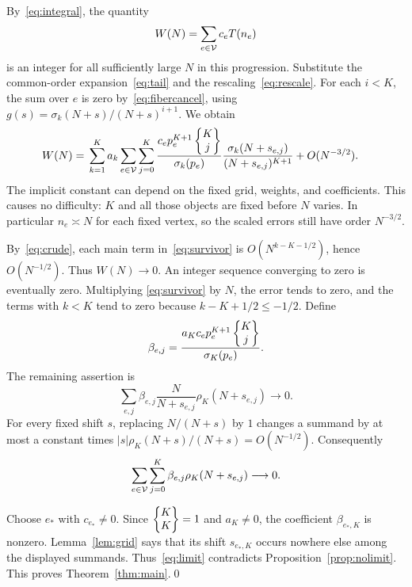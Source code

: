 By~\eqref{eq:integral}, the quantity
\[
 W(N)=\sum_{e\in\mathcal V}c_eT(n_e)
\]
is an integer for all sufficiently large $N$ in this progression.
Substitute the common-order expansion~\eqref{eq:tail} and
the rescaling~\eqref{eq:rescale}. For each $i<K$, the sum over
$e$ is zero by~\eqref{eq:fibercancel}, using
$g(s)=\sigma_k(N+s)/(N+s)^{i+1}$. We obtain
\begin{align}\label{eq:survivor}
 W(N)={}&\sum_{k=1}^{K}a_k\sum_{e\in\mathcal V}\sum_{j=0}^{K}
 \frac{c_ep_e^{K+1}\left\{\begin{matrix}K\\j\end{matrix}\right\}}{\sigma_k(p_e)}
 \frac{\sigma_k(N+s_{e,j})}{(N+s_{e,j})^{K+1}}
   +O(N^{-3/2}).
\end{align}
The implicit constant can depend on the fixed grid, weights, and
coefficients. This causes no difficulty: $K$ and all those objects
are fixed before $N$ varies. In particular $n_e\asymp N$ for each
fixed vertex, so the scaled errors still have order $N^{-3/2}$.

By~\eqref{eq:crude}, each main term in~\eqref{eq:survivor} is
$O(N^{k-K-1/2})$, hence $O(N^{-1/2})$. Thus $W(N)\to0$.
An integer sequence converging to zero is eventually zero. Multiplying
\eqref{eq:survivor} by $N$, the error tends to zero, and the terms
with $k<K$ tend to zero because $k-K+1/2\leq-1/2$.
Define
\[
 \beta_{e,j}=\frac{a_Kc_ep_e^{K+1}\left\{\begin{matrix}K\\j\end{matrix}\right\}}{\sigma_K(p_e)}.
\]
The remaining assertion is
\[
 \sum_{e,j}\beta_{e,j}
       \frac{N}{N+s_{e,j}}\rho_K(N+s_{e,j})\longrightarrow0.
\]
For every fixed shift $s$, replacing $N/(N+s)$ by $1$ changes a
summand by at most a constant times
$|s|\rho_K(N+s)/(N+s)=O(N^{-1/2})$. Consequently
\begin{equation}\label{eq:limit}
 \sum_{e\in\mathcal V}\sum_{j=0}^{K}
       \beta_{e,j}\rho_K(N+s_{e,j})\longrightarrow0.
\end{equation}

Choose $e_*$ with $c_{e_*}\ne0$. Since $\left\{\begin{matrix}K\\K\end{matrix}\right\}=1$ and
$a_K\ne0$, the coefficient $\beta_{e_*,K}$ is nonzero.
Lemma~\ref{lem:grid} says that its shift $s_{e_*,K}$ occurs
nowhere else among the displayed summands. Thus~\eqref{eq:limit}
contradicts Proposition~\ref{prop:nolimit}. This proves
Theorem~\ref{thm:main}.\qed

